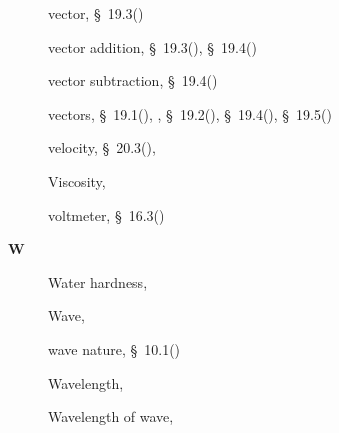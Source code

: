 \begin{multicols}{2}
{\begin{description}
	  \item[] \noindent\raggedright vector,  \S~19.3(\pageref{m38815})
	  
	  \item[] \noindent\raggedright vector addition,  \S~19.3(\pageref{m38815}),  \S~19.4(\pageref{m38816})
	  
	  \item[] \noindent\raggedright vector subtraction,  \S~19.4(\pageref{m38816})
	  
	  \item[] \noindent\raggedright vectors,  \S~19.1(\pageref{m38812}),  \pageref{id2510284},  \S~19.2(\pageref{m38813}),  \S~19.4(\pageref{m38816}),  \S~19.5(\pageref{m38819})
	  
	  \item[] \noindent\raggedright velocity,  \S~20.3(\pageref{m38791}),  \pageref{id2528771}
	  
	  \item[] \noindent\raggedright Viscosity,  \pageref{id2412552}
	  
	  \item[] \noindent\raggedright voltmeter,  \S~16.3(\pageref{m38773})
	  \vspace{.3cm}
	  \item[{\large \bfseries W}]\noindent\raggedright
	  Water hardness,  \pageref{id2491081}
	  
	  \item[] \noindent\raggedright Wave,  \pageref{id2438826}
	  
	  \item[] \noindent\raggedright wave nature,  \S~10.1(\pageref{m38777})
	  
	  \item[] \noindent\raggedright Wavelength,  \pageref{id2445839}
	  
	  \item[] \noindent\raggedright Wavelength of wave,  \pageref{id2440434}
    \end{description}
  }
      \end{multicols}
    \newpage \setlength{\parskip}{0pt}
    
